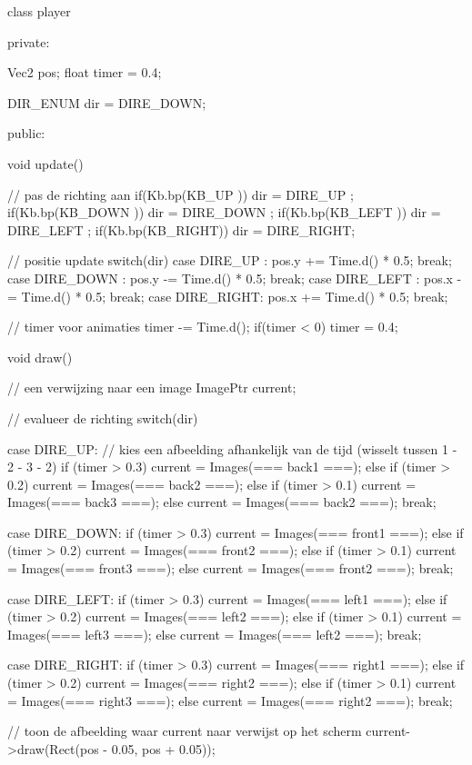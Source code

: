 \begin{code}
class player
{
private:
   
   Vec2 pos;
   float timer = 0.4;
   
   DIR_ENUM dir = DIRE_DOWN;
   
public:   
   
   
   void update()
   {
      // pas de richting aan
      if(Kb.bp(KB_UP   )) dir = DIRE_UP   ;
      if(Kb.bp(KB_DOWN )) dir = DIRE_DOWN ;
      if(Kb.bp(KB_LEFT )) dir = DIRE_LEFT ;
      if(Kb.bp(KB_RIGHT)) dir = DIRE_RIGHT;
      
      // positie update
      switch(dir)
      {
         case DIRE_UP   : pos.y += Time.d() * 0.5; break;
         case DIRE_DOWN : pos.y -= Time.d() * 0.5; break;
         case DIRE_LEFT : pos.x -= Time.d() * 0.5; break;
         case DIRE_RIGHT: pos.x += Time.d() * 0.5; break;
      }
      
      // timer voor animaties
      timer -= Time.d();
      if(timer < 0) timer = 0.4;
   }
   
   void draw()
   {
      // een verwijzing naar een image
      ImagePtr current;
      
      // evalueer de richting
      switch(dir)
      {
         case DIRE_UP:
         {
            // kies een afbeelding afhankelijk van de tijd (wisselt tussen 1 - 2 - 3 - 2)
            if      (timer > 0.3) current = Images(=== back1 ===);
            else if (timer > 0.2) current = Images(=== back2 ===);
            else if (timer > 0.1) current = Images(=== back3 ===);
            else                  current = Images(=== back2 ===);
            break;
         }
         
         case DIRE_DOWN:
         {
            if      (timer > 0.3) current = Images(=== front1 ===);
            else if (timer > 0.2) current = Images(=== front2 ===);
            else if (timer > 0.1) current = Images(=== front3 ===);
            else                  current = Images(=== front2 ===);
            break;
         }
         
         case DIRE_LEFT:
         {
            if      (timer > 0.3) current = Images(=== left1 ===);
            else if (timer > 0.2) current = Images(=== left2 ===);
            else if (timer > 0.1) current = Images(=== left3 ===);
            else                  current = Images(=== left2 ===);
            break;
         }
         
         case DIRE_RIGHT:
         {
            if      (timer > 0.3) current = Images(=== right1 ===);
            else if (timer > 0.2) current = Images(=== right2 ===);
            else if (timer > 0.1) current = Images(=== right3 ===);
            else                  current = Images(=== right2 ===);
            break;
         }
      }
      
      // toon de afbeelding waar current naar verwijst op het scherm
      current->draw(Rect(pos - 0.05, pos + 0.05));
   }   
}
\end{code}

